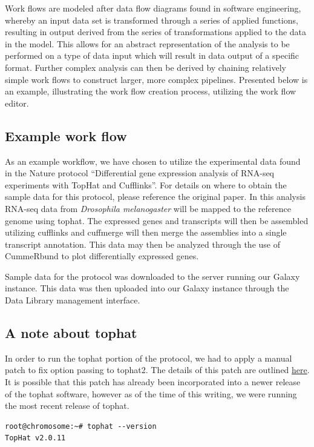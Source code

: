 \documentclass[a4paper,10pt]{article}
\begin{document}
Work flows are modeled after data flow diagrams found in software engineering, whereby an input data set is transformed through a series of applied functions, resulting in output derived from the series of transformations applied to the data in the model.  This allows for an abstract representation of the analysis to be performed on a type of data input which will result in data output of a specific format.  Further complex analysis can then be derived by chaining relatively simple work flows to construct larger, more complex pipelines.  Presented below is an example, illustrating the work flow creation process, utilizing the work flow editor.

\subsection{Example work flow}
As an example workflow, we have chosen to utilize the experimental data found in the Nature protocol ``Differential gene expression analysis of RNA-seq experiments with TopHat and Cufflinks''.  For details on where to obtain the sample data for this protocol, please reference the original paper.  In this analysis RNA-seq data from \textit{Drosophila melanogaster} will be mapped to the reference genome using tophat.  The expressed genes and transcripts will then be assembled utilizing cufflinks and cuffmerge will then merge the assemblies into a single transcript annotation.  This data may then be analyzed through the use of CummeRbund to plot differentially expressed genes.

Sample data for the protocol was downloaded to the server running our Galaxy instance.  This data was then uploaded into our Galaxy instance through the Data Library management interface.  

\subsection{A note about tophat}
In order to run the tophat portion of the protocol, we had to apply a manual patch to fix option passing to tophat2.  The details of this patch are outlined \href{https://groups.google.com/forum/#!topic/tuxedo-tools-users/vG5Rn0IgxoA}{here}.  It is possible that this patch has already been incorporated into a newer release of the tophat software, however as of the time of this writing, we were running the most recent release of tophat.
\begin{lstlisting}
root@chromosome:~# tophat --version
TopHat v2.0.11
\end{lstlisting}
\end{document}
